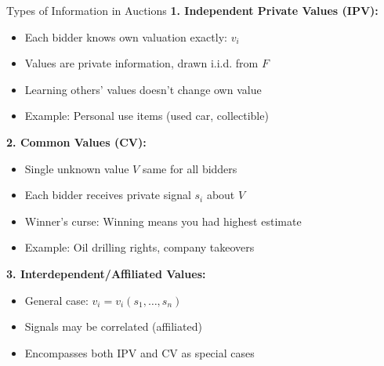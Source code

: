 \documentclass[xcolor={x11names}]{beamer}
\begin{document}
\begin{frame}{Types of Information in Auctions}
\textbf{1. Independent Private Values (IPV):}
\begin{itemize}
  \item Each bidder knows own valuation exactly: $v_i$
  \item Values are private information, drawn i.i.d. from $F$
  \item Learning others' values doesn't change own value
  \item Example: Personal use items (used car, collectible)
\end{itemize}


\textbf{2. Common Values (CV):}
\begin{itemize}
  \item Single unknown value $V$ same for all bidders
  \item Each bidder receives private signal $s_i$ about $V$
  \item Winner's curse: Winning means you had highest estimate
  \item Example: Oil drilling rights, company takeovers
\end{itemize}


\textbf{3. Interdependent/Affiliated Values:}
\begin{itemize}
  \item General case: $v_i = v_i(s_1, \ldots, s_n)$
  \item Signals may be correlated (affiliated)
  \item Encompasses both IPV and CV as special cases
\end{itemize}
\end{frame}
\end{document}
